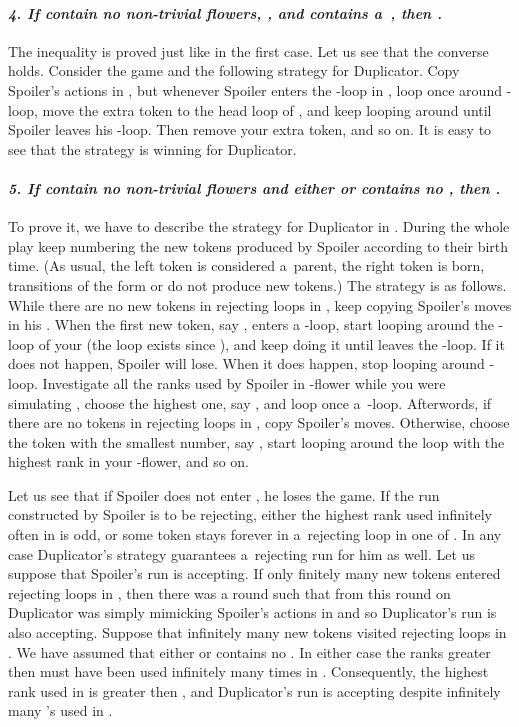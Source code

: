 \documentclass{LMCS}
\begin{document}
\paragraph{{\em 4. If  contain no non-trivial flowers, , and  contains a~, then .}} The inequality  is proved just like in the first case. Let us see that the converse holds. Consider the game  and the following strategy for Duplicator. Copy Spoiler's actions in , but whenever Spoiler enters the -loop in , loop once around -loop, move the extra token to the head loop of , and keep looping around until Spoiler leaves his -loop. Then remove your extra token, and so on. It is easy to see that the strategy is winning for Duplicator. 

\paragraph{{\em 5. If  contain no non-trivial flowers and either  or  contains no , then .}} To prove it, we have to describe the strategy for Duplicator in . During the whole play keep numbering the new tokens produced by Spoiler according to their birth time. (As usual, the left token is considered a~parent, the right token is born, transitions of the form  or  do not produce new tokens.) The strategy is as follows. While there are no new tokens in rejecting loops in , keep copying Spoiler's moves in his . When the first new token, say , enters a -loop, start looping around the -loop of your  (the loop exists since ), and keep doing it until  leaves the -loop. If it does not happen, Spoiler will lose. When it does happen, stop looping around -loop. Investigate all the ranks used by Spoiler in -flower while you were simulating , choose the highest one, say , and loop once a~-loop. Afterwords, if there are no tokens in rejecting loops in , copy Spoiler's moves. Otherwise, choose the token with the smallest number, say , start looping around the loop with the highest rank  in your -flower, and so on.

Let us see that if Spoiler does not enter , he loses the game. If the run constructed by Spoiler is to be rejecting, either the highest rank used infinitely often in  is odd, or some token stays forever in a~rejecting loop in one of . In any case Duplicator's strategy guarantees a~rejecting run for him as well. Let us suppose that Spoiler's run is accepting. If only finitely many new tokens entered rejecting loops in , then there was a round such that from this round on Duplicator was simply mimicking Spoiler's actions in  and so Duplicator's run is also accepting. Suppose that infinitely many new tokens visited rejecting loops in . We have assumed that either  or  contains no . In either case the ranks greater then  must have been used infinitely many times in . Consequently, the highest rank used in  is greater then , and Duplicator's run is accepting despite infinitely many 's used in .
\end{document}
